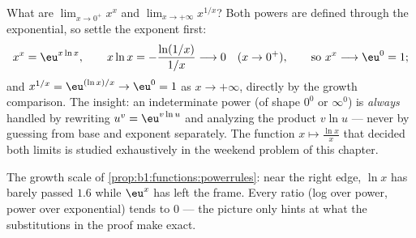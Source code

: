 \begin{example}\label{ex:b1:functions:xx}
What are $\lim_{x \to 0^+} x^x$ and $\lim_{x \to +\infty}
x^{1/x}$? Both powers are defined through the exponential, so
settle the exponent first:
\[
x^x = \eu^{x\ln x}, \qquad
x\ln x = -\frac{\ln(1/x)}{1/x} \longrightarrow 0
\quad (x \to 0^+),
\qquad\text{so } x^x \longrightarrow \eu^0 = 1 ;
\]
and $x^{1/x} = \eu^{(\ln x)/x} \to \eu^0 = 1$ as $x \to +\infty$,
directly by the growth comparison. The insight: an indeterminate
power (of shape $0^0$ or $\infty^0$) is \emph{always} handled by
rewriting $u^v = \eu^{v\ln u}$ and analyzing the product $v \ln u$
--- never by guessing from base and exponent separately. The
function $x \mapsto \frac{\ln x}{x}$ that decided both limits is
studied exhaustively in the weekend problem of this chapter.
\end{example}

\begin{omfigure}

{\small The growth scale of
\cref{prop:b1:functions:powerrules}: near the right edge, $\ln x$
has barely passed $1.6$ while $\eu^x$ has left the frame. Every
ratio (log over power, power over exponential) tends to $0$ ---
the picture only hints at what the substitutions in the proof make
exact.}
\end{omfigure}

